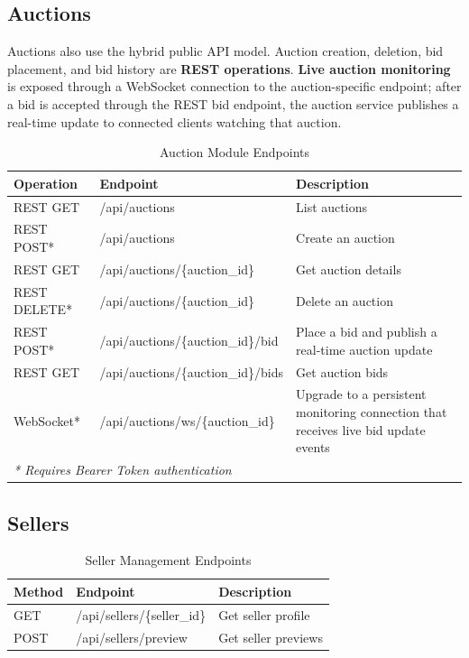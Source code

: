 \subsection{Auctions}

Auctions also use the hybrid public API model. Auction creation, deletion, bid placement, and bid history are \textbf{REST operations}. \textbf{Live auction monitoring} is exposed through a WebSocket connection to the auction-specific endpoint; after a bid is accepted through the REST bid endpoint, the auction service publishes a real-time update to connected clients watching that auction.

\begin{table}[htpb]
\centering
\footnotesize
\begin{tabular}{p{2.4cm} p{6.6cm} p{5.2cm}}
\toprule
\textbf{Operation} & \textbf{Endpoint} & \textbf{Description} \\
\midrule
REST GET & /api/auctions & List auctions \\
REST POST* & /api/auctions & Create an auction \\
REST GET & /api/auctions/\{auction\_id\} & Get auction details \\
REST DELETE* & /api/auctions/\{auction\_id\} & Delete an auction \\
REST POST* & /api/auctions/\{auction\_id\}/bid & Place a bid and publish a real-time auction update \\
REST GET & /api/auctions/\{auction\_id\}/bids & Get auction bids \\
WebSocket* & /api/auctions/ws/\{auction\_id\} & Upgrade to a persistent monitoring connection that receives live bid update events \\
\bottomrule
\multicolumn{3}{l}{\small \textit{* Requires Bearer Token authentication}}
\end{tabular}
\caption{Auction Module Endpoints}
\label{tab:api_auctions}
\end{table}

\newpage

\subsection{Sellers}
\begin{table}[htpb]
\centering
\begin{tabular}{p{1.8cm} p{6.5cm} p{6.5cm}}
\toprule
\textbf{Method} & \textbf{Endpoint} & \textbf{Description} \\
\midrule
GET & /api/sellers/\{seller\_id\} & Get seller profile \\
POST & /api/sellers/preview & Get seller previews \\
\bottomrule
\end{tabular}
\caption{Seller Management Endpoints}
\label{tab:api_sellers}
\end{table}

